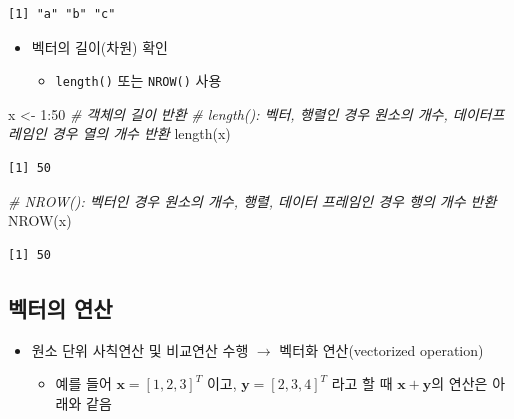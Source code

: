 \documentclass[
  11pt,
]{krantz}
\newenvironment{Shaded}{\begin{snugshade}}{\end{snugshade}}
\newcommand{\CommentTok}[1]{\textcolor[rgb]{0.37,0.37,0.37}{\textit{#1}}}
\newcommand{\DecValTok}[1]{\textcolor[rgb]{0.06,0.06,0.06}{#1}}
\newcommand{\FunctionTok}[1]{\textcolor[rgb]{0,0,0}{#1}}
\newcommand{\NormalTok}[1]{#1}
\newcommand{\OtherTok}[1]{\textcolor[rgb]{0.37,0.37,0.37}{#1}}
\newcommand{\SpecialCharTok}[1]{\textcolor[rgb]{0,0,0}{#1}}
\providecommand{\tightlist}{%
  \setlength{\itemsep}{0pt}\setlength{\parskip}{0pt}}
\begin{document}
\begin{verbatim}
[1] "a" "b" "c"
\end{verbatim}

\normalsize

\begin{itemize}
\tightlist
\item
  벡터의 길이(차원) 확인

  \begin{itemize}
  \tightlist
  \item
    \texttt{length()} 또는 \texttt{NROW()} 사용
  \end{itemize}
\end{itemize}

\footnotesize

\begin{Shaded}
\begin{Highlighting}[]
\NormalTok{x }\OtherTok{\textless{}{-}} \DecValTok{1}\SpecialCharTok{:}\DecValTok{50}
\CommentTok{\# 객체의 길이 반환}
\CommentTok{\# length(): 벡터, 행렬인 경우 원소의 개수, 데이터프레임인 경우 열의 개수 반환}
\FunctionTok{length}\NormalTok{(x) }
\end{Highlighting}
\end{Shaded}

\begin{verbatim}
[1] 50
\end{verbatim}

\begin{Shaded}
\begin{Highlighting}[]
\CommentTok{\# NROW(): 벡터인 경우 원소의 개수, 행렬, 데이터 프레임인 경우 행의 개수 반환}
\FunctionTok{NROW}\NormalTok{(x)}
\end{Highlighting}
\end{Shaded}

\begin{verbatim}
[1] 50
\end{verbatim}

\normalsize

\hypertarget{vector-operation}{%
\subsection{벡터의 연산}\label{vector-operation}}

\begin{itemize}
\tightlist
\item
  원소 단위 사칙연산 및 비교연산 수행 \(\rightarrow\) 벡터화 연산(vectorized operation)

  \begin{itemize}
  \tightlist
  \item
    예를 들어 \(\mathrm{\mathbf x} = [1, 2, 3]^T\) 이고, \(\mathrm{\mathbf y} = [2, 3, 4]^T\) 라고 할 때 \(\mathrm{\mathbf x} + \mathrm{\mathbf y}\)의 연산은 아래와 같음
  \end{itemize}
\end{itemize}
\end{document}
